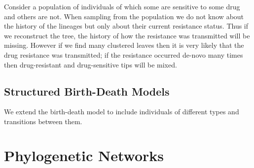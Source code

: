 \documentclass{article}
\begin{document}
\begin{multicols*}{3}
Consider a population of individuals of which some are sensitive to some drug and others are not. When sampling from the population we do not know about the history of the lineages but only about their current resistance status. Thus if we reconstruct the tree, the history of how the resistance was transmitted will be missing. However if we find many clustered leaves then it is very likely that the drug resistance was transmitted; if the resistance occurred de-novo many times then drug-resistant and drug-sensitive tips will be mixed. 

\subsection{Structured Birth-Death Models}

We extend the birth-death model to include individuals of different types and transitions between them. 

\section{Phylogenetic Networks}
\end{multicols*}
\end{document}
